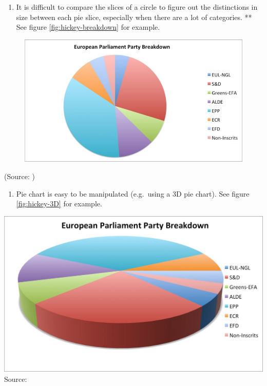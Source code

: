 \documentclass[]{book}
\providecommand{\tightlist}{%
  \setlength{\itemsep}{0pt}\setlength{\parskip}{0pt}}
\theoremstyle{definition}
\theoremstyle{definition}
\theoremstyle{definition}
\theoremstyle{remark}
\begin{document}
\begin{enumerate}
\def\labelenumi{\arabic{enumi}.}
\setcounter{enumi}{1}
\tightlist
\item
  It is difficult to compare the slices of a circle to figure out the
  distinctions in size between each pie slice, especially when there are
  a lot of categories. ** See figure \ref{fig:hickey-breakdown} for
  example.
\end{enumerate}

\begin{figure}
\centering
\includegraphics{images/hickey-breakdown.jpg}
\caption{}
\end{figure}

(Source: \citep{hickey-pie-worst})

\begin{enumerate}
\def\labelenumi{\arabic{enumi}.}
\setcounter{enumi}{2}
\tightlist
\item
  Pie chart is easy to be manipulated (e.g.~using a 3D pie chart). See
  figure \ref{fig:hickey-3D} for example.
\end{enumerate}

\includegraphics{images/hickey-3D.jpg} Source: \citep{hickey-pie-worst}
\end{document}
